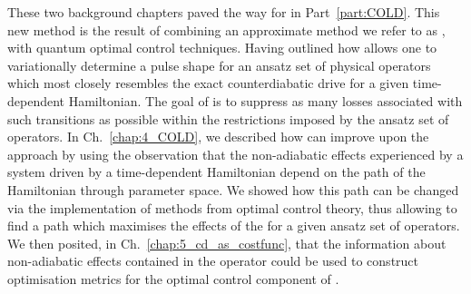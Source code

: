 These two background chapters paved the way for  in Part~\ref{part:COLD}. This new method is the result of combining an approximate  method we refer to as  \cite{sels_minimizing_2017}, with quantum optimal control techniques. Having outlined how  allows one to variationally determine a pulse shape for an ansatz set of physical operators which most closely resembles the exact counterdiabatic drive for a given time-dependent Hamiltonian. The goal of  is to suppress as many losses associated with such transitions as possible within the restrictions imposed by the ansatz set of operators. In Ch.~\ref{chap:4_COLD}, we described how  can improve upon the  approach by using the observation that the non-adiabatic effects experienced by a system driven by a time-dependent Hamiltonian depend on the path of the Hamiltonian through parameter space. We showed how this path can be changed via the implementation of methods from optimal control theory, thus allowing  to find a path which maximises the effects of the  for a given ansatz set of operators. We then posited, in Ch.~\ref{chap:5_cd_as_costfunc}, that the information about non-adiabatic effects contained in the  operator could be used to construct optimisation metrics for the optimal control component of .

